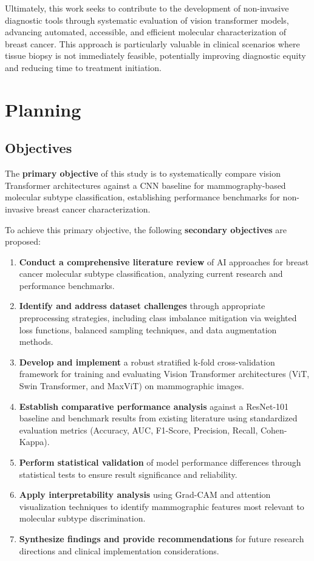 \documentclass[a4paper,10pt]{book}
\begin{document}
Ultimately, this work seeks to contribute to the development of non-invasive diagnostic tools through systematic evaluation of vision transformer models, advancing automated, accessible, and efficient molecular characterization of breast cancer. This approach is particularly valuable in clinical scenarios where tissue biopsy is not immediately feasible, potentially improving diagnostic equity and reducing time to treatment initiation.


\section{Planning}

\subsection{Objectives}

The \textbf{primary objective} of this study is to systematically compare vision Transformer architectures against a CNN baseline for mammography-based molecular subtype classification, establishing performance benchmarks for non-invasive breast cancer characterization.

To achieve this primary objective, the following \textbf{secondary objectives} are proposed:

\begin{enumerate}
	\item \textbf{Conduct a comprehensive literature review} of AI approaches for breast cancer molecular subtype classification, analyzing current research and performance benchmarks.
	\item \textbf{Identify and address dataset challenges} through appropriate preprocessing strategies, including class imbalance mitigation via weighted loss functions, balanced sampling techniques, and data augmentation methods.
	\item \textbf{Develop and implement} a robust stratified k-fold cross-validation framework for training and evaluating Vision Transformer architectures (ViT, Swin Transformer, and MaxViT) on mammographic images.
	\item \textbf{Establish comparative performance analysis} against a ResNet-101 baseline and benchmark results from existing literature using standardized evaluation metrics (Accuracy, AUC, F1-Score, Precision, Recall, Cohen-Kappa).
	\item \textbf{Perform statistical validation} of model performance differences through statistical tests to ensure result significance and reliability.
	\item \textbf{Apply interpretability analysis} using Grad-CAM and attention visualization techniques to identify mammographic features most relevant to molecular subtype discrimination.
	\item \textbf{Synthesize findings and provide recommendations} for future research directions and clinical implementation considerations.
\end{enumerate}
\end{document}
